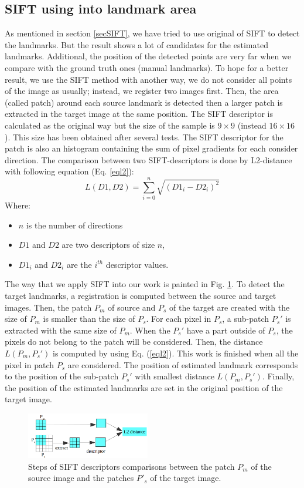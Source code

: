 \documentclass{gretsi}
\begin{document}
\subsection{SIFT using into landmark area}
As mentioned in section \ref{secSIFT}, we have tried to use original of SIFT to detect the landmarks. But the result shows a lot of candidates for the estimated landmarks. Additional, the position of the detected points are very far when we compare with the ground truth ones (manual landmarks). To hope for a better result, we use the SIFT method with another way, we do not consider all points of the image as usually; instead, we register two images first. Then, the area (called patch) around each source landmark is detected then a larger patch is extracted in the target image at the same position. The SIFT descriptor is calculated as the original way but the size of the sample is $9 \times 9$ (instead $16 \times 16$). This size has been obtained after several tests. The SIFT descriptor for the patch is also an histogram containing the sum of pixel gradients for each consider direction. The comparison between two SIFT-descriptors is done by L2-distance with following equation (Eq. \ref{eql2}):
\begin{equation}
\label{eql2}
	L(D1,D2) = \sum\limits_{i = 0}^{n}\sqrt{(D1_i-D2_i)^2}
\end{equation}
Where:
\begin{itemize}%
	\item $n$ is the number of directions
	\item $D1$ and $D2$ are two descriptors of size $n$,
	\item $D1_i$ and $D2_i $ are the $i^{th}$ descriptor values.
\end{itemize}
The way that we apply SIFT into our work is painted in Fig. \ref{fig4}. To detect the target landmarks, a registration is computed between the source and target images. Then, the patch $P_m$ of source and $P_s$ of the target are created with the size of $P_m$ is smaller than the size of $P_s$. For each pixel in $P_s$, a sub-patch $P_s'$ is extracted with the same size of $P_m$. When the $P_s'$ have a part outside of $P_s$, the pixels do not belong to the patch will be considered. Then, the distance $L(P_m,P_s')$ is computed by using Eq. (\ref{eql2}). This work is finished when all the pixel in patch $P_s$ are considered. The position of estimated landmark corresponds to the position of the sub-patch $P_s'$ with smallest distance $L(P_m,P_s')$. Finally, the position of the estimated landmarks are set in the original position of the target image.
\begin{figure}[htb]
    \centering
    \includegraphics[width=0.48\textwidth]{./images/illustration_SIFT}
    \caption{Steps of SIFT descriptors comparisons between the patch $P_m$ of the source image and the patches $P'_s$ of the target image.}
    \label{fig4}
\end{figure}
\end{document}
